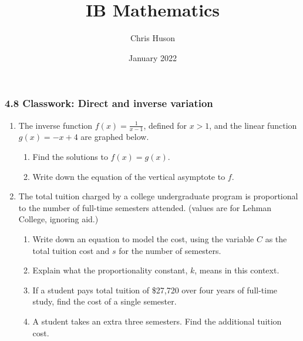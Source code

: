 \documentclass[12pt, twoside]{article}
\title{IB Mathematics}
\author{Chris Huson}
\date{January 2022}
\begin{document}
\subsubsection*{4.8 Classwork: Direct and inverse variation}
\begin{enumerate}
\item The inverse function $\displaystyle f(x)=\frac{1}{x-1}$, defined for $x>1$, and the linear function \\$g(x)=-x+4$ are graphed below. 
    \begin{multicols}{2}
        \begin{enumerate}
            \item Find the solutions to $f(x)=g(x)$. \vspace{2cm}
            \item Write down the equation of the vertical asymptote to $f$.
        \end{enumerate} \vspace{1cm}
        \begin{flushright}
    \end{flushright}
    \end{multicols}

\item The total tuition charged by a college undergraduate program is proportional to the number of full-time semesters attended. (values are for Lehman College, ignoring aid.)
\begin{enumerate}[itemsep=0.7cm]
    \item Write down an equation to model the cost, using the variable $C$ as the total tuition cost and $s$ for the number of semesters.
    \item Explain what the proportionality constant, $k$, means in this context.
    \item If a student pays total tuition of \$27,720 over four years of full-time study, find the cost of a single semester.
    \item A student takes an extra three semesters. Find the additional tuition cost.
\end{enumerate} \vspace{1cm}


\end{enumerate}
\end{document}
